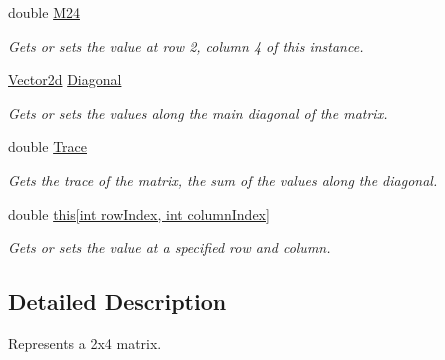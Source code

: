\begin{DoxyCompactItemize}
double \hyperlink{struct_open_t_k_1_1_matrix2x4d_a48a33c90ec140be681b04153a81e99c9}{M24}
\begin{DoxyCompactList}\small\item\em Gets or sets the value at row 2, column 4 of this instance. \end{DoxyCompactList}\item 
\hyperlink{struct_open_t_k_1_1_vector2d}{Vector2d} \hyperlink{struct_open_t_k_1_1_matrix2x4d_a6af45195f3072eb873dc29721fdc1075}{Diagonal}
\begin{DoxyCompactList}\small\item\em Gets or sets the values along the main diagonal of the matrix. \end{DoxyCompactList}\item 
double \hyperlink{struct_open_t_k_1_1_matrix2x4d_a8756b543bb600eaa9e2205b5565ee09b}{Trace}
\begin{DoxyCompactList}\small\item\em Gets the trace of the matrix, the sum of the values along the diagonal. \end{DoxyCompactList}\item 
double \hyperlink{struct_open_t_k_1_1_matrix2x4d_a89ae4635cbac9bcce42f80f0d02d11d8}{this\mbox{[}int row\-Index, int column\-Index\mbox{]}}
\begin{DoxyCompactList}\small\item\em Gets or sets the value at a specified row and column. \end{DoxyCompactList}\end{DoxyCompactItemize}


\subsection{Detailed Description}
Represents a 2x4 matrix. 



